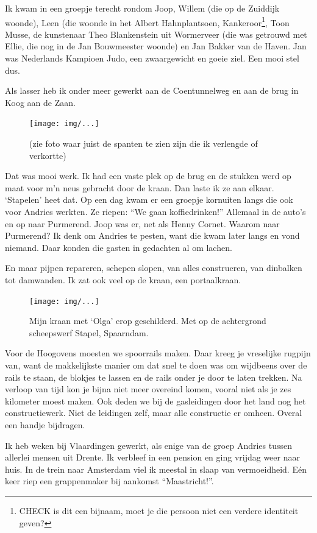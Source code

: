 \documentclass[12pt,twoside, openright]{memoir}
\begin{document}
Ik kwam in een groepje terecht rondom Joop, Willem (die op de Zuiddijk woonde), Leen (die woonde in het Albert Hahnplantsoen, Kankeroor\footnote{CHECK is dit een bijnaam, moet je die persoon niet een verdere identiteit geven?}, Toon Musse, de kunstenaar Theo Blankenstein uit Wormerveer (die was  getrouwd met Ellie, die nog in de Jan Bouwmeester woonde) en Jan Bakker van de Haven. Jan was Nederlands Kampioen Judo, een zwaargewicht en goeie ziel. Een mooi stel dus.

Als lasser heb ik onder meer gewerkt aan de Coentunnelweg en aan de brug in Koog aan de Zaan. 

\begin{figure}[t]
\texttt{[image: img/...]}
\caption{(zie foto waar juist de spanten te zien zijn die ik verlengde of verkortte)}
\end{figure}

Dat was mooi werk. Ik had een vaste plek op de brug en de stukken werd op maat voor m’n neus gebracht door de kraan. Dan laste ik ze aan elkaar. `Stapelen' heet dat. Op een dag kwam er een groepje kornuiten langs die ook voor Andries werkten. Ze riepen: ``We gaan koffiedrinken!'' Allemaal in de auto’s en op naar Purmerend. Joop was er, net als Henny Cornet. Waarom naar Purmerend? Ik denk om Andries te pesten, want die kwam later langs en vond niemand. Daar konden die gasten in gedachten al om lachen.

En maar pijpen repareren, schepen slopen, van alles construeren, van dinbalken tot damwanden. Ik zat ook veel op de kraan, een portaalkraan. 

\begin{figure}[t]
\texttt{[image: img/...]}
\caption{Mijn kraan met ‘Olga’ erop geschilderd. Met op de achtergrond scheepswerf Stapel, Spaarndam.}
\end{figure}

Voor de Hoogovens moesten we spoorrails maken. Daar kreeg je vreselijke rugpijn van, want de makkelijkste manier om dat snel te doen was om wijdbeens over de rails te staan, de blokjes te lassen en de rails onder je door te laten trekken. Na verloop van tijd kon je bijna niet meer overeind komen, vooral niet als je zes kilometer moest maken. Ook deden we bij de gasleidingen door het land nog het constructiewerk. Niet de leidingen zelf, maar alle constructie er omheen. Overal een handje bijdragen.

Ik heb weken bij Vlaardingen gewerkt, als enige van de groep Andries tussen allerlei mensen uit Drente. Ik verbleef in een pension en ging vrijdag weer naar huis. In de trein naar Amsterdam viel ik meestal in slaap van vermoeidheid. Eén keer riep een grappenmaker bij aankomst ``Maastricht!''. 
\end{document}
